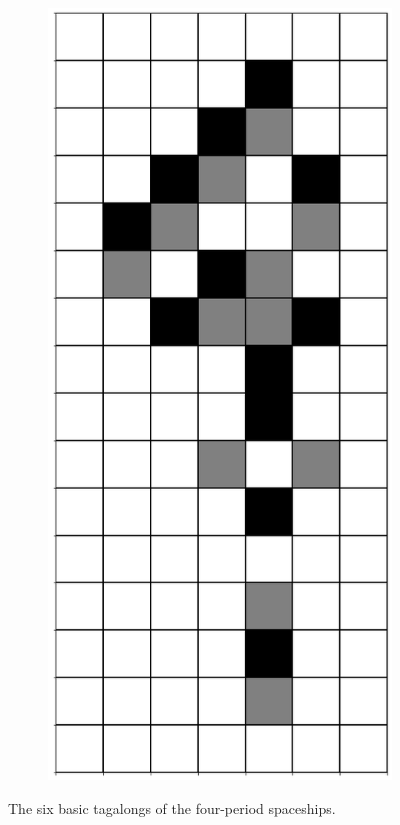 \documentclass[12pt]{article}
\numberwithin{figure}{section} %
\begin{document}
\begin{figure}[H]
\begin{subfigure}{0.16\textwidth}
     		\includegraphics[width=\linewidth]{Section4/21.5}
     	\subcaption{}
   	\end{subfigure}
      	\newline
   	\setcounter{subfigure}{0}
	\caption[Tagalongs of four-period spaceships]{The six basic tagalongs of the four-period spaceships.}
	\label{fig:tagalongs of four-period spaceships}
\end{figure}
\end{document}
